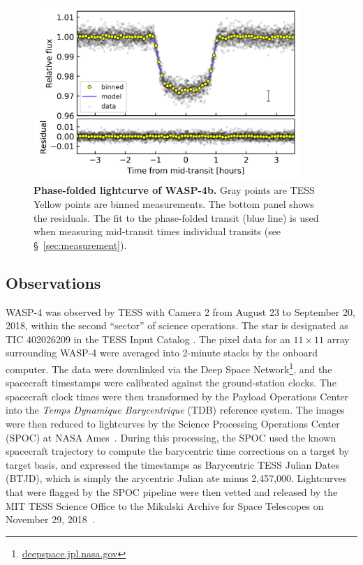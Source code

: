 \documentclass[12pt,twocolumn,tighten]{aastex62}
\begin{document}
\begin{figure}[t]
    \begin{center}
        \includegraphics[width=0.9\textwidth]{f2.png}
    \end{center}
    \vspace{-0.7cm}
    \caption{
        {\bf Phase-folded lightcurve of WASP-4b.} Gray points are
        TESS  
        Yellow points are binned measurements.  The bottom
        panel shows the residuals.  The fit to the phase-folded
        transit (blue line) is used when measuring mid-transit times
         individual transits (see 
        \S~\ref{sec:measurement}).
        \label{fig:phasefold}
    }
\end{figure}

\subsection{Observations}

WASP-4 was observed by TESS with Camera 2 from August 23 to September
20, 2018, within the second ``sector'' of science operations.  The
star is designated as TIC 402026209 in the TESS Input Catalog
\citep{stassun_TIC_2018}.  The pixel data for an $11\times11$ array
surrounding WASP-4 were averaged into 2-minute stacks by the onboard
computer.  The data were downlinked via the Deep Space
Network\footnote{\url{deepspace.jpl.nasa.gov}}, and the
spacecraft timestamps were calibrated against the ground-station
clocks.  The spacecraft clock times were then transformed by the
Payload Operations Center into the {\it Temps Dynamique Barycentrique}
(TDB) reference system.  The images were then reduced to lightcurves
by the Science Processing Operations Center (SPOC) at NASA
Ames~\citep{jenkins_tess_2016}.  During this processing, the SPOC used
the known spacecraft trajectory to compute the barycentric time
corrections on a target by target basis, and expressed the timestamps
as Barycentric TESS Julian Dates (BTJD), which is simply the
arycentric Julian ate minus
2{,}457{,}000.  Lightcurves that were flagged  by the SPOC pipeline  were then vetted and released by the MIT TESS
Science Office to the Mikulski Archive for Space Telescopes on
November 29, 2018~\citep{ricker_tess_alerts_2018}.
\end{document}
